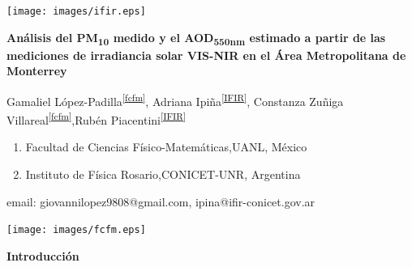 \documentclass{article}
\begin{document}
\vspace*{-2cm}
\changefontsizes{14pt}
\hspace*{-1cm}
\begin{minipage}{0.2\linewidth}
\vspace{0.7cm}
\vspace*{-0.15cm}
\texttt{[image: images/ifir.eps]}
\end{minipage}
\vspace*{-0.4cm}
\begin{minipage}{0.6\linewidth}
\vspace*{0.7cm}
\begin{center}
\changefontsizes{15pt}
\hspace*{-0.1cm}
\textbf{\textcolor{title}{Análisis del PM\textsubscript{10} medido y el AOD\textsubscript{550nm} estimado a partir de las mediciones de irradiancia solar VIS-NIR en el Área Metropolitana de Monterrey}}
\end{center}
\vspace{-1cm}
\begin{center}
\changefontsizes{11pt}
Gamaliel López-Padilla\textsuperscript{\ref{fcfm}}, Adriana Ipiña\textsuperscript{\ref{IFIR}}, Constanza Zuñiga Villareal\textsuperscript{\ref{fcfm}},Rubén Piacentini\textsuperscript{\ref{IFIR}}\\
\begin{enumerate}
    \centering
    \vspace{-0.25cm}
    \item Facultad de Ciencias Físico-Matemáticas,UANL, México \label{fcfm} \vspace{-0.25cm}
    \item Instituto de Física Rosario,CONICET-UNR, Argentina \label{IFIR} \vspace{-0.25cm}
\end{enumerate}
email: giovannilopez9808@gmail.com, ipina@ifir-conicet.gov.ar
\end{center}
\end{minipage}
\begin{minipage}{0.2\linewidth}
\hspace*{0.2cm}
\texttt{[image: images/fcfm.eps]}
\end{minipage}
\vspace{0.2cm}
\changefontsizes{12pt}
\begin{center}
\begin{shaded}
\textbf{\textcolor{ver}{Introducción}}
\end{shaded}
\end{center}
\end{document}
